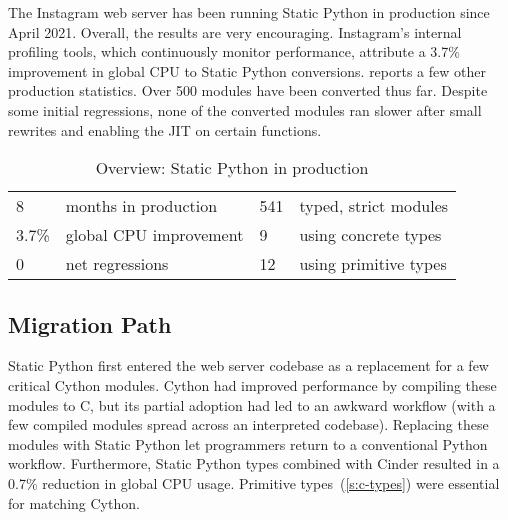\documentclass[english,cleveref,submission]{programming}
\newcommand{\SP}{Static Python}
\newcommand{\CPUchange}{3.7\%}
\begin{document}


The Instagram web server has been running \SP{} in production since April 2021.
Overall, the results are very encouraging.
Instagram's internal profiling tools, which continuously monitor
performance, attribute a \CPUchange{} improvement in global CPU to \SP{} conversions.
 reports a few other production statistics.
Over 500 modules have been converted thus far.
Despite some initial regressions, none of the converted modules
ran slower after small rewrites and enabling the JIT on certain functions.

\begin{table}
  \caption{Overview: \SP{} in production}
  \label{t:prod-stat}
  \begin{tabular}{l@{~~}l@{\qquad}l@{~~}l}
    8     & months in production   & 541   & typed, strict modules \\
    \CPUchange{} & global CPU improvement &   9   & using concrete types \\
    0     & net regressions        &  12   & using primitive types \\
  \end{tabular}
\end{table}


\subsection{Migration Path}

\SP{} first entered the web server codebase as a replacement for a
few critical Cython modules.
Cython had improved performance by compiling these modules to C,
but its partial adoption had led to an awkward workflow (with a
few compiled modules spread across an interpreted codebase).
Replacing these modules with \SP{} let programmers return to a conventional
Python workflow.
Furthermore, \SP{} types combined with Cinder resulted in a
0.7\% reduction in global CPU usage.
Primitive types~(\cref{s:c-types}) were essential for matching Cython.
\end{document}
